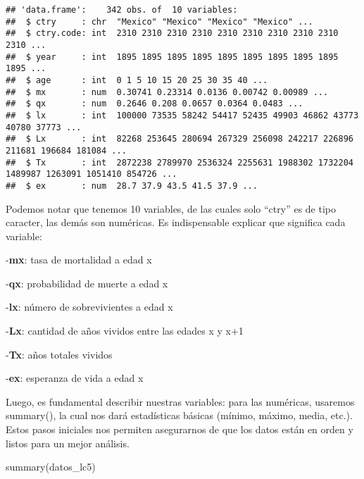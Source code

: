 \documentclass[
]{article}
\newenvironment{Shaded}{\begin{snugshade}}{\end{snugshade}}
\newcommand{\FunctionTok}[1]{\textcolor[rgb]{0.00,0.00,0.00}{#1}}
\newcommand{\NormalTok}[1]{#1}
\begin{document}
\begin{verbatim}
## 'data.frame':    342 obs. of  10 variables:
##  $ ctry     : chr  "Mexico" "Mexico" "Mexico" "Mexico" ...
##  $ ctry.code: int  2310 2310 2310 2310 2310 2310 2310 2310 2310 2310 ...
##  $ year     : int  1895 1895 1895 1895 1895 1895 1895 1895 1895 1895 ...
##  $ age      : int  0 1 5 10 15 20 25 30 35 40 ...
##  $ mx       : num  0.30741 0.23314 0.0136 0.00742 0.00989 ...
##  $ qx       : num  0.2646 0.208 0.0657 0.0364 0.0483 ...
##  $ lx       : int  100000 73535 58242 54417 52435 49903 46862 43773 40780 37773 ...
##  $ Lx       : int  82268 253645 280694 267329 256098 242217 226896 211681 196684 181084 ...
##  $ Tx       : int  2872238 2789970 2536324 2255631 1988302 1732204 1489987 1263091 1051410 854726 ...
##  $ ex       : num  28.7 37.9 43.5 41.5 37.9 ...
\end{verbatim}

Podemos notar que tenemos 10 variables, de las cuales solo ``ctry'' es
de tipo caracter, las demás son numéricas. Es indispensable explicar que
significa cada variable:

-\textbf{mx}: tasa de mortalidad a edad x

-\textbf{qx}: probabilidad de muerte a edad x

-\textbf{lx}: número de sobrevivientes a edad x

-\textbf{Lx}: cantidad de años vividos entre las edades x y x+1

-\textbf{Tx}: años totales vividos

-\textbf{ex}: esperanza de vida a edad x

Luego, es fundamental describir nuestras variables: para las numéricas,
usaremos summary(), la cual nos dará estadísticas básicas (mínimo,
máximo, media, etc.). Estos pasos iniciales nos permiten asegurarnos de
que los datos están en orden y listos para un mejor análisis.

\begin{Shaded}
\begin{Highlighting}[]
\FunctionTok{summary}\NormalTok{(datos\_lc5)}
\end{Highlighting}
\end{Shaded}
\end{document}
